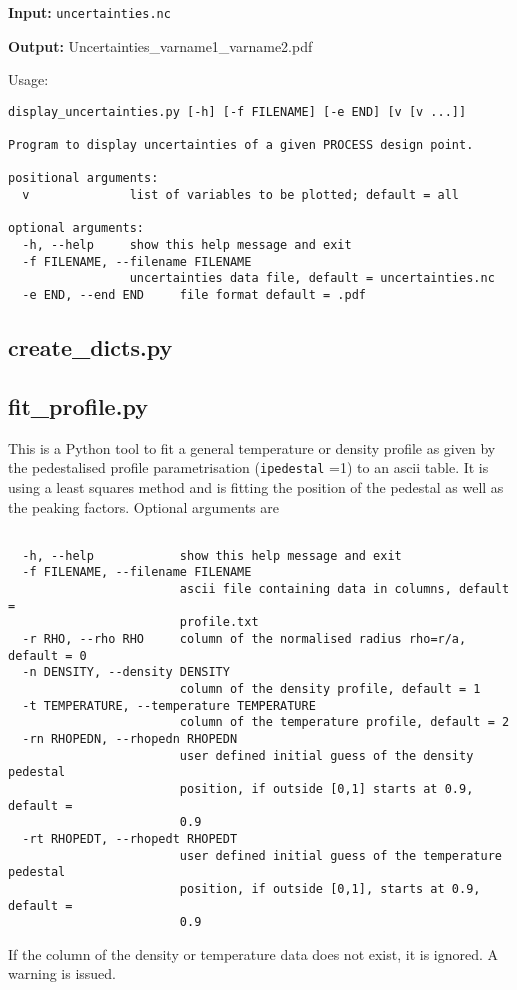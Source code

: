 \begin{description}
\item{\textbf{Input:}}
 \texttt{uncertainties.nc}
                                
\item{\textbf{Output:}}
Uncertainties\_varname1\_varname2.pdf
\end{description}

Usage:
\begin{verbatim}
display_uncertainties.py [-h] [-f FILENAME] [-e END] [v [v ...]]

Program to display uncertainties of a given PROCESS design point.

positional arguments:
  v              list of variables to be plotted; default = all

optional arguments:
  -h, --help     show this help message and exit
  -f FILENAME, --filename FILENAME
                 uncertainties data file, default = uncertainties.nc
  -e END, --end END     file format default = .pdf
\end{verbatim}

\subsection{create\_dicts.py}


\subsection{fit\_profile.py}

This is a Python tool to fit a general temperature or density profile as given
by the pedestalised profile parametrisation (\texttt{ipedestal} =1) to an
ascii table. It is using a least squares method and is fitting the position of
the pedestal as well as the peaking factors.  Optional arguments are
\begin{verbatim}

  -h, --help            show this help message and exit
  -f FILENAME, --filename FILENAME
                        ascii file containing data in columns, default =
                        profile.txt
  -r RHO, --rho RHO     column of the normalised radius rho=r/a, default = 0
  -n DENSITY, --density DENSITY
                        column of the density profile, default = 1
  -t TEMPERATURE, --temperature TEMPERATURE
                        column of the temperature profile, default = 2
  -rn RHOPEDN, --rhopedn RHOPEDN
                        user defined initial guess of the density pedestal
                        position, if outside [0,1] starts at 0.9, default =
                        0.9
  -rt RHOPEDT, --rhopedt RHOPEDT
                        user defined initial guess of the temperature pedestal
                        position, if outside [0,1], starts at 0.9, default =
                        0.9

\end{verbatim}
If the column of the density or temperature data does not exist, it is
ignored. A warning is issued.


